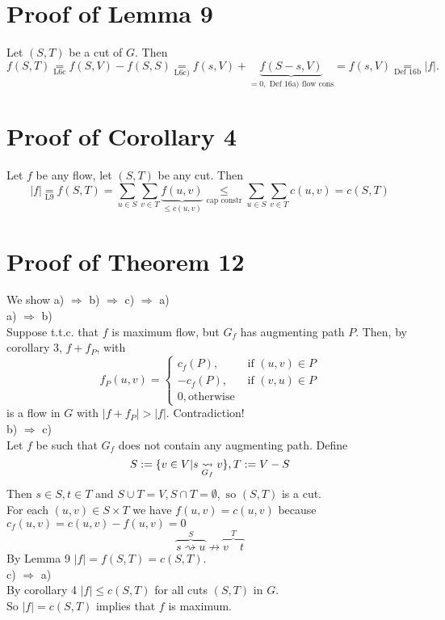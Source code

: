 \documentclass[12pt,oneside,a4paper,parskip=on,fleqn]{scrartcl}
\begin{document}
	\section*{Proof of Lemma 9} %
	\label{sec:proof_of_lemma_9}
		Let $(S,T)$ be a cut of $G$. Then
		\[
			f(S,T) \underset{\text{L6c}}{=} f(S,V) - f(S,S) \underset{\text{L6c)}}{=} f(s,V) + \underbrace{f(S-s,V)}_{=0,\text{ Def 16a) flow cons}} = f(s,V) \underset{\text{Def 16b}}{=} |f|.
		\]
	\section*{Proof of Corollary 4} %
	\label{sec:proof_of_corollary_4}
		Let $f$ be any flow, let $(S,T)$ be any cut. Then
		\[
			|f| \underset{\text{L9}}{=} f(S,T) = \sum_{u\in S}\sum_{v\in T} \underbrace{f(u,v)}_{\leq c(u,v)} \underset{\text{cap constr}}{\leq}
			\sum_{u\in S}\sum_{v\in T} c(u,v) = c(S,T)
		\]
	\section*{Proof of Theorem 12} %
	\label{sec:proof_of_theorem_12}
		We show a) $\Rightarrow$ b) $\Rightarrow$ c) $\Rightarrow$ a)\\
		\glqq a) $\Rightarrow$ b)\grqq\\ Suppose t.t.c. that $f$ is maximum flow, but $G_f$ has augmenting path $P$. Then, by corollary 3, $f+f_P$, with
		\[
			f_P(u,v) = \begin{cases}
				c_f(P), &\text{ if }(u,v)\in P\\
				-c_f(P), &\text{ if }(v,u)\in P\\
				0, \text{otherwise}
			\end{cases}
		\]
		is a flow in $G$ with $|f+f_P| > |f|$. Contradiction!\\
		\glqq b) $\Rightarrow$ c)\grqq\\
		Let $f$ be such that $G_f$ does not contain any augmenting path.
		Define \[
			S:=\{v\in V|s\underset{G_f}{\rightsquigarrow} v\},\\ T:= V-S
		\]
		Then $s\in S, t\in T$ and $S\cup T = V, S\cap T=\emptyset, \text{ so } (S,T)$ is a cut.\\
		For each $(u,v)\in S\times T$ we have $f(u,v) = c(u,v)$ because $c_f(u,v) = c(u,v) - f(u,v) = 0$
		\[
			\overbrace{s \rightsquigarrow u}^{S} \not\rightarrow \overbrace{v \quad t}^{T}
		\]
		By Lemma 9 $|f| = f(S,T) = c(S,T)$.\\
		\glqq c) $\Rightarrow$ a)\grqq\\
		By corollary 4 $|f| \leq c(S,T)$ for all cuts $(S,T)$ in $G$.\\
		So $|f| = c(S,T)$ implies that $f$ is maximum.
\end{document}
